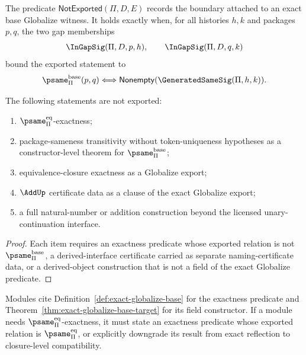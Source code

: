 \begin{definition}
\label{def:not-exported}
The predicate $\mathsf{NotExported}(\Pi,D,E)$ records the boundary attached to an exact base Globalize witness. It holds exactly when, for all histories $h,k$ and packages $p,q$, the two gap memberships
$$
\InGapSig(\Pi,D,p,h),
\qquad
\InGapSig(\Pi,D,q,k)
$$
bound the exported statement to
$$
\psame_{\Pi}^{\mathrm{base}}(p,q)
\Longleftrightarrow
\mathsf{Nonempty}(\GeneratedSameSig(\Pi,h,k)).
$$
\end{definition}

\begin{proposition}
\label{prop:not-exported}
The following statements are not exported:
\begin{enumerate}
  \item \(\psame_{\Pi}^{\mathrm{eq}}\)-exactness;
  \item package-sameness transitivity without token-uniqueness hypotheses as a constructor-level theorem for \(\psame_{\Pi}^{\mathrm{base}}\);
  \item equivalence-closure exactness as a Globalize export;
  \item $\AddUp$ certificate data as a clause of the exact Globalize export;
  \item a full natural-number or addition construction beyond the licensed unary-continuation interface.
\end{enumerate}
\end{proposition}

\begin{proof}
Each item requires an exactness predicate whose exported relation is not $\psame_{\Pi}^{\mathrm{base}}$, a derived-interface certificate carried as separate naming-certificate data, or a derived-object construction that is not a field of the exact Globalize predicate.
\end{proof}

\begin{protocol}
\label{prot:export-discipline}
Modules cite Definition~\ref{def:exact-globalize-base} for the exactness predicate and Theorem~\ref{thm:exact-globalize-base-target} for its field constructor. If a module needs $\psame_{\Pi}^{\mathrm{eq}}$-exactness, it must state an exactness predicate whose exported relation is $\psame_{\Pi}^{\mathrm{eq}}$, or explicitly downgrade its result from exact reflection to closure-level compatibility.
\end{protocol}

